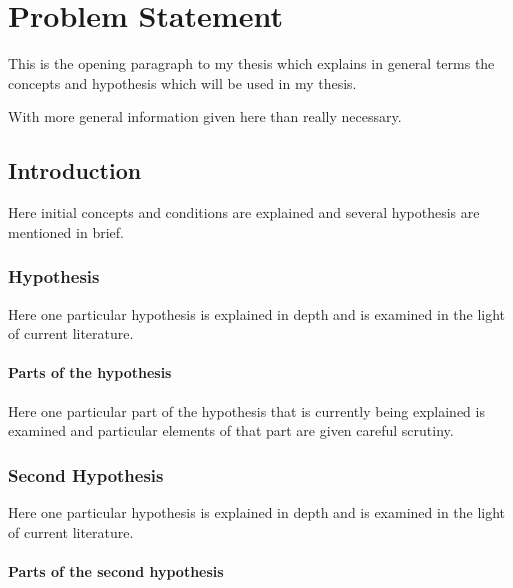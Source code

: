 \chapter{Problem Statement}

This is the opening paragraph to my thesis which
explains in general terms the concepts and hypothesis
which will be used in my thesis.

With more general information given here than really
necessary.

\section{Introduction}

Here initial concepts and conditions are explained and
several hypothesis are mentioned in brief.

\subsection{Hypothesis}

Here one particular hypothesis is explained in depth
and is examined in the light of current literature.

\subsubsection{Parts of the hypothesis}

Here one particular part of the hypothesis that is 
currently being explained is examined and particular
elements of that part are given careful scrutiny.


\subsection{Second Hypothesis}

Here one particular hypothesis is explained in depth
and is examined in the light of current literature.

\subsubsection{Parts of the second hypothesis}


